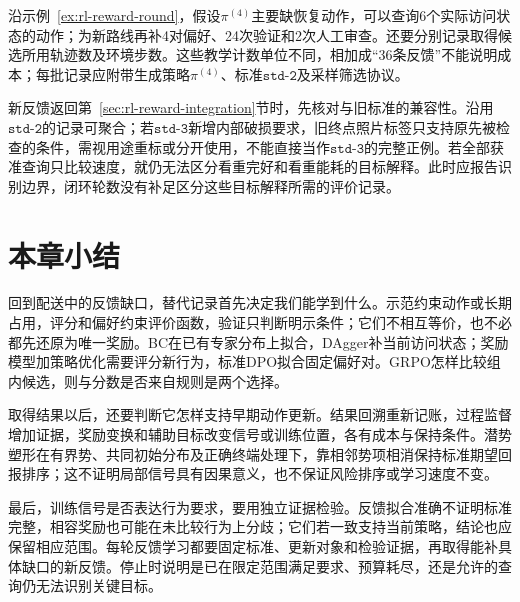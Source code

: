 沿示例~\ref{ex:rl-reward-round}，假设$\pi^{(4)}$主要缺恢复动作，可以查询6个实际访问状态的动作；为新路线再补4对偏好、24次验证和2次人工审查。还要分别记录取得候选所用轨迹数及环境步数。这些教学计数单位不同，相加成“36条反馈”不能说明成本；每批记录应附带生成策略$\pi^{(4)}$、标准$\texttt{std-2}$及采样筛选协议。

新反馈返回第~\ref{sec:rl-reward-integration}节时，先核对与旧标准的兼容性。沿用$\texttt{std-2}$的记录可聚合；若$\texttt{std-3}$新增内部破损要求，旧终点照片标签只支持原先被检查的条件，需视用途重标或分开使用，不能直接当作$\texttt{std-3}$的完整正例。若全部获准查询只比较速度，就仍无法区分看重完好和看重能耗的目标解释。此时应报告识别边界，闭环轮数没有补足区分这些目标解释所需的评价记录。

\section{本章小结}
\label{sec:rl-reward-summary}

回到配送中的反馈缺口，替代记录首先决定我们能学到什么。示范约束动作或长期占用，评分和偏好约束评价函数，验证只判断明示条件；它们不相互等价，也不必都先还原为唯一奖励。BC在已有专家分布上拟合，DAgger补当前访问状态；奖励模型加策略优化需要评分新行为，标准DPO拟合固定偏好对。GRPO怎样比较组内候选，则与分数是否来自规则是两个选择。

取得结果以后，还要判断它怎样支持早期动作更新。结果回溯重新记账，过程监督增加证据，奖励变换和辅助目标改变信号或训练位置，各有成本与保持条件。潜势塑形在有界势、共同初始分布及正确终端处理下，靠相邻势项相消保持标准期望回报排序；这不证明局部信号具有因果意义，也不保证风险排序或学习速度不变。

最后，训练信号是否表达行为要求，要用独立证据检验。反馈拟合准确不证明标准完整，相容奖励也可能在未比较行为上分歧；它们若一致支持当前策略，结论也应保留相应范围。每轮反馈学习都要固定标准、更新对象和检验证据，再取得能补具体缺口的新反馈。停止时说明是已在限定范围满足要求、预算耗尽，还是允许的查询仍无法识别关键目标。
